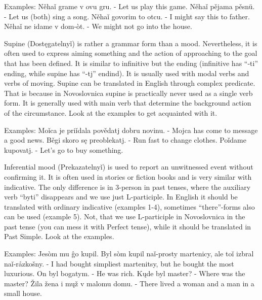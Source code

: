 Examples:
Něhaǐ grame v ovu gru. - Let us play this game.
Něhaǐ pějama pěsnü. - Let us (both) sing a song.
Něhaǐ govorim to otcu. - I might say this to father.
Něhaǐ ne idame v dom-òt. - We might not go into the house.


Supine (Dostęgatelnyǐ) is rather a grammar form than a mood. Nevertheless, it is often used to express aiming something and the action of approaching to the goal that has been defined. It is similar to infinitive but the ending (infinitive has “-ti” ending, while supine has “-tj” endind). It is usually used with modal verbs and verbs of moving.
Supine can be translated in English through complex predicate. That is because in Novoslovnica supine is practically never used as a single verb form. It is generally used with main verb that determine the background action of the circumstance. Look at the examples to get acquainted with it.

Examples:
Moǐca je priǐdala povědatj dobru novinu. - Mojca has come to message a good news.
Běgi skoro sę preoblekatj. - Run fast to change clothes.
Poǐdame kupovatj. - Let’s go to buy something.

Inferential mood (Prekazatelnyǐ) is used to report an unwitnessed event without confirming it. It is often used in stories or fiction books and is very similar with indicative. The only difference is in 3-person in past tenses, where the auxiliary verb “byti” disappears and we use just L-participle. In English it should be translated with ordinary indicative (examples 1-4), sometimes “there”-forms also can be used (example 5). Not, that we use L-participle in Novoslovnica in the past tense (you can mess it with Perfect tense), while it should be translated in Past Simple.
Look at the examples.

Examples:
Jesòm mu ĝo kupil.
Byl sòm kupil naǐ-prosty martenicy, ale toǐ izbral naǐ-råzkošny. - I had bought simpliest martenitsy, but he bought the most luxurious.
On byl bogatym. - He was rich.
Kųde byl master? - Where was the master?
Žila žena i mųž v malomu domu. - There lived a woman and a man in a small house.
